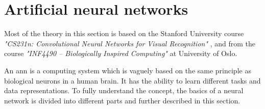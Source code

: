 \documentclass[USenglish]{ifimaster}  %
\begin{document}
\section{Artificial neural networks}
Most of the theory in this section is based on the Stanford University course \textit{"CS231n: Convolutional Neural Networks for Visual Recognition"} \cite{website:cs231n}, and from the course \textit{"INF4490 – Biologically Inspired Computing"} \cite{website:inf_4490_slp}\cite{website:inf_4490_mlp} at University of Oslo.

An \ac{ann} is a computing system which is vaguely based on the same principle as biological neurons in a human brain. It has the ability to learn different tasks and data representations. To fully understand the concept, the basics of a neural network is divided into different parts and further described in this section.
\end{document}
